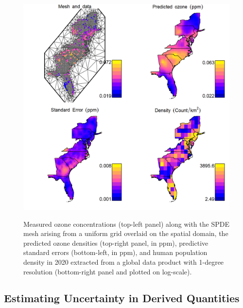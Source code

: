\begin{figure}[!ht]
    \caption[Predicted and observed ozone concentrations]{Measured ozone concentrations (top-left panel) along with the SPDE mesh arising from a uniform grid overlaid on the spatial domain, the predicted ozone densities (top-right panel, in ppm), predictive standard errors (bottom-left, in ppm), and human population density in 2020 extracted from a global data product with 1-degree resolution (bottom-right panel and plotted on log-scale).}
    \centering
    \includegraphics[width=5.5in]{Chap_6/Mapped_ozone.png}
    \label{fig:Chap6_Mapped_ozone}
\end{figure}

\subsection{Estimating Uncertainty in Derived Quantities} \label{sec:Chap6_sample_joint_precision}

